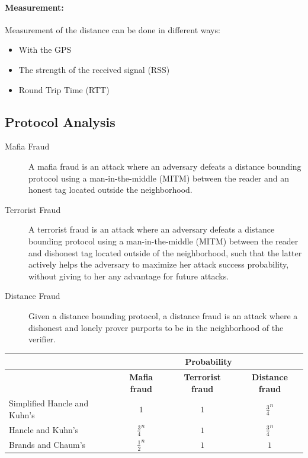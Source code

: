\paragraph{Measurement:}
Measurement of the distance can be done in different ways:
\begin{itemize}
    \item With the GPS
    \item The strength of the received signal (RSS)
    \item Round Trip Time (RTT)
\end{itemize}


\subsection{Protocol Analysis}
\begin{description}
    \item[Mafia Fraud] A mafia fraud is an attack where an adversary defeats a
    distance bounding protocol using a man-in-the-middle (MITM) between the
    reader and an honest tag located outside the neighborhood.
    \item[Terrorist Fraud] A terrorist fraud is an attack where an
        adversary defeats a distance bounding protocol using a man-in-the-middle (MITM)
    between the reader and dishonest tag located outside of the neighborhood,
    such that the latter actively helps the adversary to maximize her attack
    success probability, without giving to her any advantage for future
    attacks.
    \item[Distance Fraud] Given a distance bounding protocol, a distance fraud
    is an attack where a dishonest and lonely prover purports to be in the
    neighborhood of the verifier.
\end{description}

\begin{center}
    \begin{tabular}{|l|c|c|c|}
        \hline
        &\multicolumn{3}{c|}{Probability} \\
        \hline
        &\bf Mafia fraud &\bf  Terrorist fraud &\bf  Distance fraud \\
        \hline
        Simplified Hancle and Kuhn's & $1$ & $1$ &$\frac{3}{4}^n$\\
        Hancle and Kuhn's & $\frac{3}{4}^n$& $1$ &$\frac{3}{4}^n$\\
        Brands and Chaum's & $\frac{1}{2}^n$& $1$ &$1$\\
        \hline
    \end{tabular}
\end{center}

